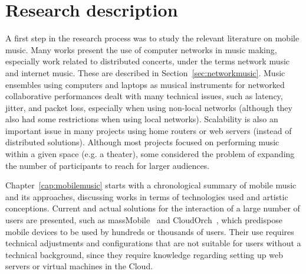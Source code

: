 \section{Research description}

A first step in the research process was to study the relevant literature on mobile music.
Many works present the use of computer networks in music making, especially work related to distributed concerts, under the terms network music and internet music.
These are described in Section~\ref{sec:networkmusic}.
Music ensembles using computers and laptops as musical instruments for networked collaborative performances dealt with many technical issues, such as latency, jitter, and packet loss, especially when using non-local networks (although they also had some restrictions when using local networks).
Scalability is also an important issue in many projects using home routers or web servers (instead of distributed solutions).
Although most projects focused on performing music within a given space (e.g. a theater), some considered the problem of expanding the number of participants to reach for larger audiences.

Chapter~\ref{cap:mobilemusic} starts with a chronological summary of mobile music and its approaches, discussing
works in terms of technologies used and artistic conceptions.
Current and actual solutions for the interaction of a large number of users are presented, such as massMobile~\citep{Weitzner2012massmobile} and CloudOrch~\citep{Hindle2014cloudorch}, which predispose mobile devices to be used by hundreds or thousands of users.
Their use requires technical adjustments and configurations that are not suitable for users without a technical background, since they require knowledge regarding setting up web servers or virtual machines in the Cloud.

